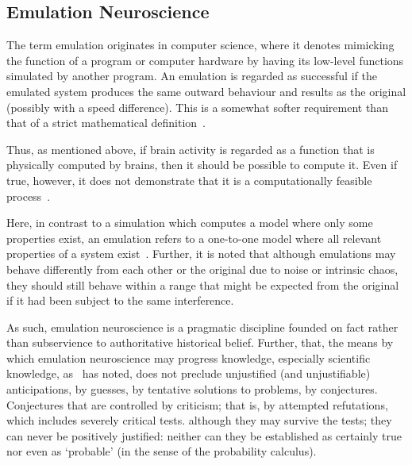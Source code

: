 \documentclass[11pt,3p,twocolumn]{JMN}
\begin{document}
\subsection{Emulation Neuroscience}
\label{subsection:emuneuro}


The term emulation originates in computer science, where it denotes mimicking the function of a program or computer hardware by having its low-level functions simulated by another program. An emulation is regarded as successful if the emulated system produces the same outward behaviour and results as the original (possibly with a speed difference). This is a somewhat softer requirement than that of a strict mathematical definition~\citep[see, for example,][]{sandberg08}.

Thus, as mentioned above, if brain activity is regarded as a function that is physically computed by brains, then it should be possible to compute it. Even if true, however, it does not demonstrate that it is a computationally feasible process~\citep{sandberg08}.

Here, in contrast to a simulation which computes a model where only some properties exist, an emulation refers to a one-to-one model where all relevant properties of a system exist~\citep{sandberg08}. Further, it is noted that although emulations may behave differently from each other or the original due to noise or intrinsic chaos, they should still behave within a range that might be expected from the original if it had been subject to the same interference.

As such, emulation neuroscience is a pragmatic discipline founded on fact rather than subservience to authoritative historical belief. Further, that, the means by which emulation neuroscience may progress knowledge, especially scientific knowledge, as~\citet{popper62} has noted, does not preclude unjustified (and unjustifiable) anticipations, by guesses, by tentative solutions to problems, by conjectures. Conjectures that are controlled by criticism; that is, by attempted refutations, which includes severely critical tests. although they may survive the tests; they can never be positively justified: neither can they be established as certainly true nor even as `probable' (in the sense of the probability calculus).
\end{document}
